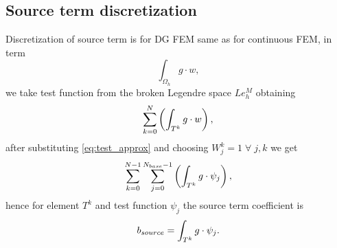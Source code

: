 \subsection{Source term discretization}
\label{se:source_term}
Discretization of source term is for DG FEM same as for continuous FEM, 
in term
\begin{equation}
\int_{\Omega_h} g\cdot w,
\end{equation}
we take test function from the broken Legendre space $Le_h^M$ obtaining 
\begin{equation}
\sum\limits_{k=0}^{N}\left(\int_{T^k} g\cdot w\right),
\end{equation}
after substituting \eqref{eq:test_approx} and choosing $W_j^k = 1 \; \forall \; 
j, k$ we get
\begin{equation}
\sum\limits_{k=0}^{N - 1}\sum\limits_{j=0}^{N_{base} - 1}\left(\int_{T^k} g\cdot 
\psi_j \right),
\end{equation}
hence for element $T^k$ and test function $\psi_j$ the source term coefficient is
\begin{equation}
b_{source} = \int_{T^k} g\cdot \psi_j.
\end{equation}

\newpage
